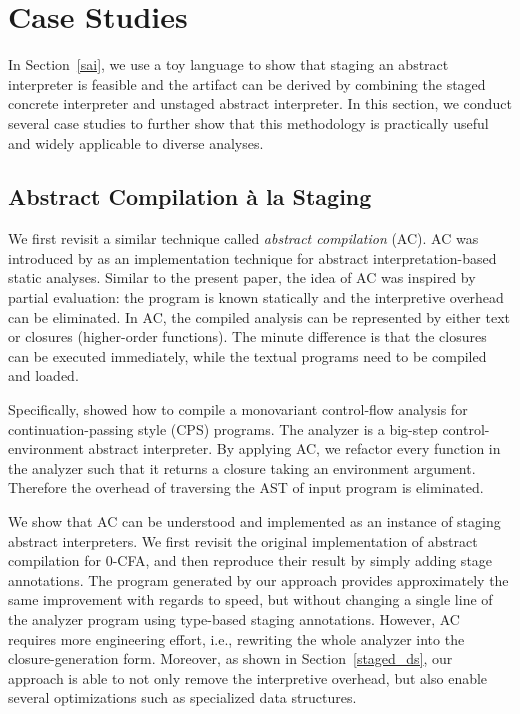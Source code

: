 \section{Case Studies} \label{cases_study}

In Section~\ref{sai}, we use a toy language to show that staging an abstract
interpreter is feasible and the artifact can be derived by combining the staged
concrete interpreter and unstaged abstract interpreter.
In this section, we conduct several case studies to further show that this
methodology is practically useful and widely applicable to diverse analyses.

\subsection{Abstract Compilation \`a la Staging} \label{cs_ac}

We first revisit a similar technique called \textit{abstract compilation} (AC).
AC was introduced by \citet{Boucher:1996:ACN:647473.727587} as an
implementation technique for abstract interpretation-based static analyses.
Similar to the present paper, the idea of AC was inspired by partial evaluation:
the program is known statically and the interpretive overhead can be
eliminated. In AC, the compiled analysis can be represented by either text or
closures (higher-order functions). The minute difference is that the closures
can be executed immediately, while the textual programs need to be compiled and
loaded.

Specifically, \citeauthor{Boucher:1996:ACN:647473.727587} showed how to compile a
monovariant control-flow analysis \cite{Shivers:1991:SSC:115865.115884,
Shivers:1988:CFA:53990.54007} for continuation-passing style (CPS) programs.
The analyzer is a big-step control-environment abstract interpreter. 
By applying AC, we refactor every function in the analyzer such that it
returns a closure taking an environment argument.  Therefore the overhead
of traversing the AST of input program is eliminated.

We show that AC can be understood and implemented as an instance of staging abstract
interpreters. We first revisit the original implementation of abstract
compilation for 0-CFA, and then reproduce their result by simply adding stage
annotations.  The program generated by our approach provides approximately the
same improvement with regards to speed, but without changing a single line of
the analyzer program using type-based staging annotations. However, AC requires
more engineering effort, i.e., rewriting the whole analyzer into the
closure-generation form. Moreover, as shown in Section~\ref{staged_ds}, our
approach is able to not only remove the interpretive overhead, but also enable
several optimizations such as specialized data structures.


